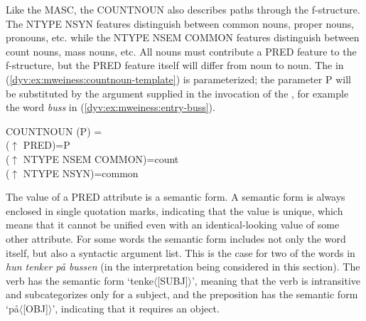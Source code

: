 \documentclass[output=paper]{langsci/langscibook}
\begin{document}
Like the  MASC, the  COUNTNOUN also describes paths through the f-structure.
The NTYPE NSYN features distinguish between common nouns, proper nouns, pronouns, etc. while the NTYPE NSEM COMMON features distinguish between count nouns, mass nouns, etc.
All nouns must contribute a PRED feature to the f-structure, but the PRED feature itself will differ from noun to noun.
The  in (\ref{dyv:ex:mweiness:countnoun-template}) is parameterized; the parameter P will be substituted by the argument supplied in the invocation of the , for example the word \textit{buss} in (\ref{dyv:ex:mweiness:entry-buss}).


\ea\label{dyv:ex:mweiness:countnoun-template}
{\small 
COUNTNOUN (P) = \\
\hspace{2em}  ($\uparrow$ PRED)=P \\
\hspace{2em}  ($\uparrow$ NTYPE NSEM COMMON)=count \\
\hspace{2em}  ($\uparrow$ NTYPE NSYN)=common \\
}
\z

The value of a PRED attribute is a semantic form.
A semantic form is always enclosed in single quotation marks, indicating that the value is unique, which means that it cannot be unified even with an identical-looking value of some other attribute.
For some words the semantic form includes not only the word itself, but also a syntactic argument list.
This is the case for two of the words in \textit{hun tenker på bussen} (in the interpretation being considered in this section).
The verb has the semantic form `tenke$\langle$[SUBJ]$\rangle$', meaning that the verb is intransitive and subcategorizes only for a subject, and the preposition has the semantic form `på$\langle$[OBJ]$\rangle$', indicating that it requires an object.
\end{document}
